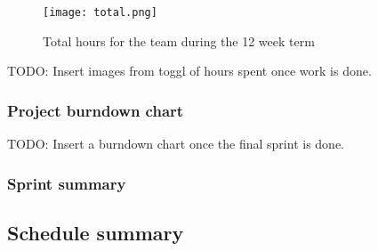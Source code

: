 \begin{figure}[H]
  \centering
  \graphicspath{ {./graphics/} }
  \centerline{\texttt{[image: total.png]}}
  \caption{\label{fig:total}Total hours for the team during the 12 week term}
\end{figure}

TODO: Insert images from toggl of hours spent once work is done.

\subsubsection{Project burndown chart}

TODO: Insert a burndown chart once the final sprint is done.

\subsubsection{Sprint summary}

\subsection{Schedule summary}